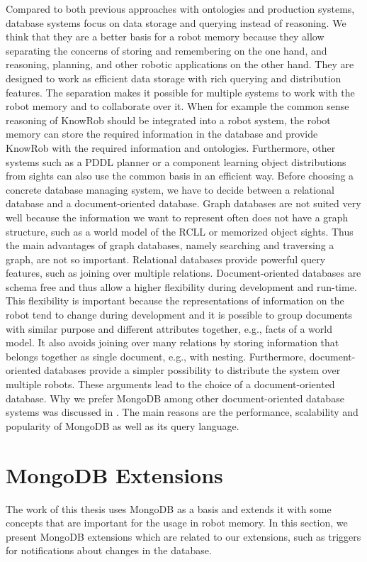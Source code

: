 Compared to both previous approaches with ontologies and production
systems, database systems focus on data storage and querying instead
of reasoning. We think that they are a better basis for a robot memory
because they allow separating the concerns of storing and remembering
on the one hand, and reasoning, planning, and other robotic
applications on the other hand. They are designed to work as efficient
data storage with rich querying and distribution features. The
separation makes it possible for multiple systems to work with the
robot memory and to collaborate over it. When for example the common
sense reasoning of KnowRob should be integrated into a robot system,
the robot memory can store the required information in the database
and provide KnowRob with the required information and
ontologies. Furthermore, other systems such as a PDDL planner or a
component learning object distributions from sights can also use the
common basis in an efficient way. Before choosing a concrete database
managing system, we have to decide between a relational database and a
document-oriented database. Graph databases are not suited very well
because the information we want to represent often does not have a
graph structure, such as a world model of the RCLL or memorized object
sights. Thus the main advantages of graph databases, namely searching
and traversing a graph, are not so important. Relational databases provide powerful query features,
such as joining over multiple relations. Document-oriented databases
are schema free and thus allow a higher flexibility during development
and run-time. This flexibility is important because the representations of
information on the robot tend to change during development and it is
possible to group documents with similar purpose and different
attributes together, e.g., facts of a world model. It also avoids
joining over many relations by storing information that
belongs together as single document, e.g., with nesting.  Furthermore,
document-oriented databases provide a simpler possibility to
distribute the system over multiple robots. These arguments lead to
the choice of a document-oriented database. Why we prefer MongoDB
among other document-oriented database systems was discussed in
. The main reasons are the performance,
scalability and popularity of MongoDB as well as its query language.

\section{MongoDB Extensions}
\label{sec:mongodb-extensions}
The work of this thesis uses MongoDB as a basis and extends it with
some concepts that are important for the usage in robot memory. In
this section, we present MongoDB extensions which are related to our
extensions, such as triggers for notifications about changes
in the database.

